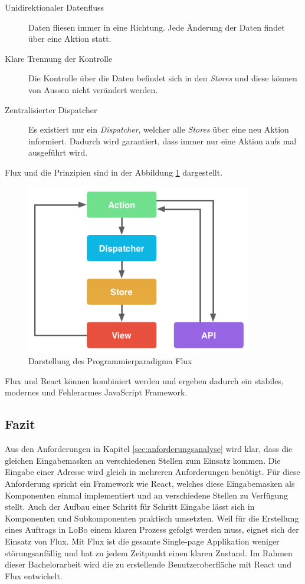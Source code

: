\begin{description}
	\item[Unidirektionaler Datenfluss] Daten fliesen immer in eine Richtung. Jede Änderung der Daten findet über eine Aktion statt.
	\item[Klare Trennung der Kontrolle] Die Kontrolle über die Daten befindet sich in den \textit{Stores} und diese können von Aussen nicht verändert werden.
	\item[Zentralisierter Dispatcher] Es existiert nur ein \textit{Dispatcher}, welcher alle \textit{Stores} über eine neu Aktion informiert. Dadurch wird garantiert, dass immer nur eine Aktion aufs mal ausgeführt wird.
\end{description}
Flux und die Prinzipien sind in der Abbildung \ref{fig:flux} dargestellt.

\begin{figure}[ht]
	\centering
  \includegraphics[width=0.88\textwidth]{images/flux.png}
	\caption{Darstellung des Programmierparadigma Flux}
	\label{fig:flux}
\end{figure}
Flux und React können kombiniert werden und ergeben dadurch ein stabiles, modernes und Fehlerarmes JavaScript Framework.

\subsection{Fazit}
Aus den Anforderungen in Kapitel \ref{sec:anforderungsanalyse} wird klar, dass die gleichen Eingabemasken an verschiedenen Stellen zum Einsatz kommen. Die Eingabe einer Adresse wird gleich in mehreren Anforderungen benötigt. Für diese Anforderung spricht ein Framework wie React, welches diese Eingabemasken als Komponenten einmal implementiert und an verschiedene Stellen zu Verfügung stellt. Auch der Aufbau einer Schritt für Schritt Eingabe lässt sich in Komponenten und Subkomponenten praktisch umsetzten. Weil für die Erstellung eines Auftrags in LoBo einem klaren Prozess gefolgt werden muss, eignet sich der Einsatz von Flux. Mit Flux ist die gesamte Single-page Applikation weniger störungsanfällig und hat zu jedem Zeitpunkt einen klaren Zustand. Im Rahmen dieser Bachelorarbeit wird die zu erstellende Benutzeroberfläche mit React und Flux entwickelt.


